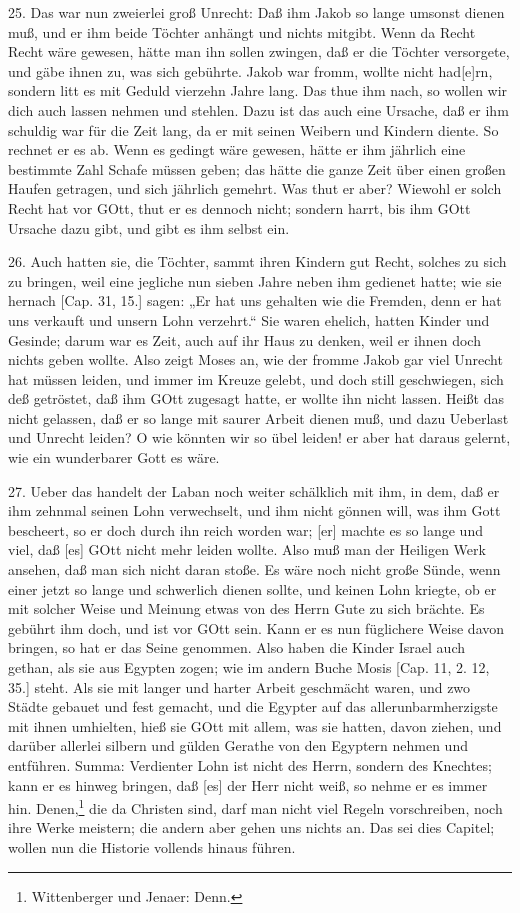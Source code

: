 25. Das war nun zweierlei groß Unrecht: Daß ihm Jakob so lange umsonst dienen muß, und er ihm beide Töchter anhängt und nichts mitgibt. Wenn da Recht Recht wäre gewesen, hätte man ihn sollen zwingen, daß er die Töchter versorgete, und gäbe ihnen zu, was sich gebührte. Jakob war fromm, wollte nicht had[e]rn, sondern litt es mit Geduld vierzehn Jahre lang. Das thue ihm nach, so wollen wir dich auch lassen nehmen und stehlen. Dazu ist das auch eine Ursache, daß er ihm schuldig war für die Zeit lang, da er mit seinen Weibern und Kindern diente. So rechnet er es ab. Wenn es gedingt wäre gewesen, hätte er ihm jährlich eine bestimmte Zahl Schafe müssen geben; das hätte die ganze Zeit über einen großen Haufen getragen, und sich jährlich gemehrt. Was thut er aber? Wiewohl er solch Recht hat vor GOtt, thut er es dennoch nicht; sondern harrt, bis ihm GOtt Ursache dazu gibt, und gibt es ihm selbst ein.

26. Auch hatten sie, die Töchter, sammt ihren Kindern gut Recht, solches zu sich zu bringen, weil eine jegliche nun sieben Jahre neben ihm gedienet hatte; wie sie hernach [Cap. 31, 15.] sagen: „Er hat uns gehalten wie die Fremden, denn er hat uns verkauft und unsern Lohn verzehrt.“ Sie waren ehelich, hatten Kinder und Gesinde; darum war es Zeit, auch auf ihr Haus zu denken, weil er ihnen doch nichts geben wollte. Also zeigt Moses an, wie der fromme Jakob gar viel Unrecht hat müssen leiden, und immer im Kreuze gelebt, und doch still geschwiegen, sich deß getröstet, daß ihm GOtt zugesagt hatte, er wollte ihn nicht lassen. Heißt das nicht gelassen, daß er so lange mit saurer Arbeit dienen muß, und dazu Ueberlast und Unrecht leiden? O wie könnten wir so übel leiden! er aber hat daraus gelernt, wie ein wunderbarer Gott es wäre.

27. Ueber das handelt der Laban noch weiter schälklich mit ihm, in dem, daß er ihm zehnmal seinen Lohn verwechselt, und ihm nicht gönnen will, was ihm Gott bescheert, so er doch durch ihn reich worden war; [er] machte es so lange und viel, daß [es] GOtt nicht mehr leiden wollte. Also muß man der Heiligen Werk ansehen, daß man sich nicht daran stoße. Es wäre noch nicht große Sünde, wenn einer jetzt so lange und schwerlich dienen sollte, und keinen Lohn kriegte, ob er mit solcher Weise und Meinung etwas von des Herrn Gute zu sich brächte. Es gebührt ihm doch, und ist vor GOtt sein. Kann er es nun füglichere Weise davon bringen, so hat er das Seine genommen. Also haben die Kinder Israel auch gethan, als sie aus Egypten zogen; wie im andern Buche Mosis [Cap. 11, 2. 12, 35.] steht. Als sie mit langer und harter Arbeit geschmächt waren, und zwo Städte gebauet und fest gemacht, und die Egypter auf das allerunbarmherzigste mit ihnen umhielten, hieß sie GOtt mit allem, was sie hatten, davon ziehen, und darüber allerlei silbern und gülden Gerathe von den Egyptern nehmen und entführen. Summa: Verdienter Lohn ist nicht des Herrn, sondern des Knechtes; kann er es hinweg bringen, daß [es] der Herr nicht weiß, so nehme er es immer hin. Denen,\footnote{Wittenberger und Jenaer: Denn.} die da Christen sind, darf man nicht viel Regeln vorschreiben, noch ihre Werke meistern; die andern aber gehen uns nichts an. Das sei dies Capitel; wollen nun die Historie vollends hinaus führen.

